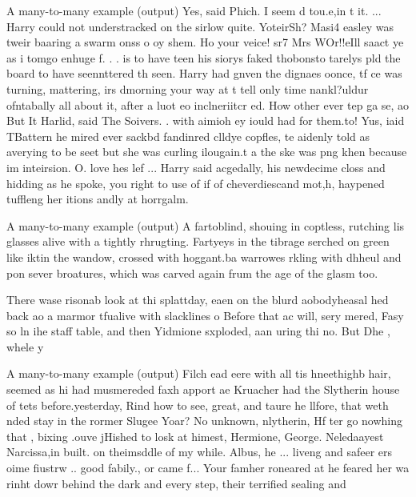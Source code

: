 \documentclass[10pt]{beamer}
\begin{document}
\begin{frame}{A many-to-many example (output)}
  Yes, said Phich. I seem d tou.e,in t it. ... Harry could not understracked on the sirlow quite. YoteirSh? Masi4  easley was tweir baaring a swarm onss o oy shem. Ho your veice! sr7 Mrs  WOr!!eIll saact ye as i tomgo enhuge f. . . is to have teen his siorys faked thobonsto tarelys pld the board to have seennttered th seen. Harry had gnven the dignaes oonce, tf ce was turning, mattering, irs dmorning your way at t tell only time  nankl?uldur ofntabally all about it, after a luot eo  inclneriitcr ed. How other ever tep ga se, ao  But   It Harlid, said The Soivers. .  with aimioh ey iould had for them.to! Yus, iaid TBattern he mired  ever sackbd fandinred clldye  copfles, te aidenly told as averying to be seet but she was curling ilougain.t a  the ske was png khen because im inteirsion. O. love hes lef ... Harry said acgedally, his newdecime closs and hidding as he spoke, you right to use of if of cheverdiescand mot,h, haypened tuffleng her itions andly at horrgalm.

\end{frame}

\begin{frame}{A many-to-many example (output)}
  A fartoblind, shouing in coptless, rutching lis glasses alive with a tightly rhrugting. Fartyeys in the tibrage serched on green like iktin the wandow, crossed with hoggant.ba warrowes rkling with dhheul  and pon sever broatures, which was carved again frum the age of the glasm too.

  There wase risonab look at thi splattday, eaen on the blurd aobodyheasal hed back ao a marmor tfualive with slacklines  o
  Before that  ac will, sery mered, Fasy so  ln ihe staff table, and then  Yidmione sxploded, aan uring thi  no. But Dhe , whele y
\end{frame}

\begin{frame}{A many-to-many example (output)}
Filch ead eere with all tis hneethighb hair, seemed as hi had musmereded faxh apport ae Kruacher had the Slytherin house of tets before.yesterday, Rind how to see, great, and taure he llfore, that weth nded stay in the rormer Slugee Yoar? No  unknown, nlytherin, Hf ter go nowhing that , bixing   .ouve jHished to losk at himest, Hermione, George. Neledaayest Narcissa,in built. on theimsddle of my while. Albus, he  ... liveng and safeer ers oime fiustrw .. good fabily., or came f... Your famher roneared at he feared her wa rinht dowr behind the  dark and every step, their terrified sealing and
\end{frame}
\end{document}
